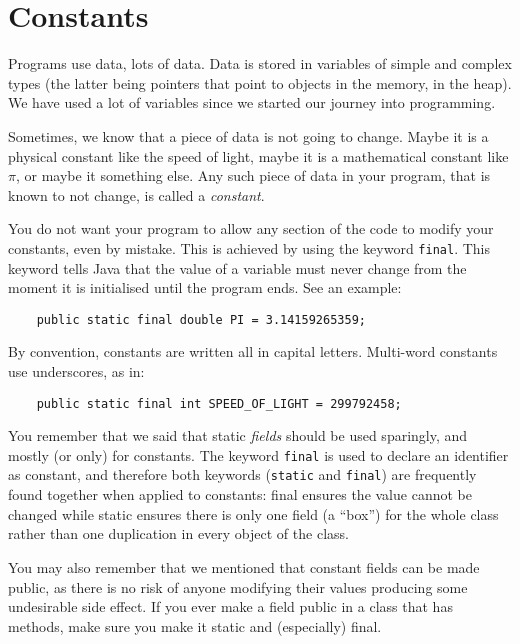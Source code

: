 
\section{Constants}
\label{sec:constants}

Programs use data, lots of data. Data is stored in variables of simple
and complex types (the latter being pointers that point to objects in
the memory, in the heap). We have used a lot of variables since we
started our journey into programming. 

Sometimes, we know that a piece of data is not going to change. 
Maybe it is a physical constant like the
speed of light, maybe it is a mathematical constant like $\pi$, or
maybe it something else. Any such piece of data in your program, that
is known to not change, is called a \emph{constant}. 

You do not want your program to allow any section
of the code to modify your constants, even by mistake. This is achieved by
using the keyword \verb+final+. This keyword tells Java that the value
of a variable must never change from the moment it is initialised
until the program ends. See an example: 

\begin{verbatim}
    public static final double PI = 3.14159265359; 
\end{verbatim}

By convention, constants are written all in capital
letters. Multi-word constants use underscores, as in: 

\begin{verbatim}
    public static final int SPEED_OF_LIGHT = 299792458;
\end{verbatim}

You remember that we said that static \emph{fields} should be used
sparingly, and mostly (or only) for constants. The keyword
\verb+final+ is used to declare an identifier as constant, and
therefore both keywords (\verb+static+ and \verb+final+)
are frequently found together when applied to constants: final ensures
the value cannot be changed while static ensures there is only one
field (a ``box'') for the whole class rather than one duplication in
every object of the class.

You may also remember that we mentioned that constant fields can be
made public, as there is no risk of anyone modifying their values
producing some undesirable side effect. If you ever make a field public in a
class that has methods, make sure you make it static and (especially)
final.

